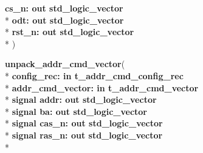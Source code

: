 \begin{DoxyCompactItemize}
  {\bfseries \textcolor{vhdlchar}{ }\textcolor{vhdlchar}{cs\+\_\+n\+: }\textcolor{stringliteral}{} {\bfseries \textcolor{keywordflow}{out}\textcolor{vhdlchar}{ }\textcolor{comment}{std\+\_\+logic\+\_\+vector}\textcolor{vhdlchar}{ }}}\\*
  {\bfseries \textcolor{vhdlchar}{ }\textcolor{vhdlchar}{odt\+: }\textcolor{stringliteral}{} {\bfseries \textcolor{keywordflow}{out}\textcolor{vhdlchar}{ }\textcolor{comment}{std\+\_\+logic\+\_\+vector}\textcolor{vhdlchar}{ }}}\\*
  {\bfseries \textcolor{vhdlchar}{ }\textcolor{vhdlchar}{rst\+\_\+n\+: }\textcolor{stringliteral}{} {\bfseries \textcolor{keywordflow}{out}\textcolor{vhdlchar}{ }\textcolor{comment}{std\+\_\+logic\+\_\+vector}\textcolor{vhdlchar}{ }}}\\*
   )
\item 
{\bfseries {\bfseries \textcolor{vhdlchar}{ }}} {\bf unpack\+\_\+addr\+\_\+cmd\+\_\+vector}( \\*
{\bfseries \textcolor{vhdlchar}{ }\textcolor{vhdlchar}{config\+\_\+rec\+: }\textcolor{stringliteral}{} {\bfseries \textcolor{keywordflow}{in}\textcolor{vhdlchar}{ }{\bfseries {\bf t\+\_\+addr\+\_\+cmd\+\_\+config\+\_\+rec}} \textcolor{vhdlchar}{ }}}\\*
  {\bfseries \textcolor{vhdlchar}{ }\textcolor{vhdlchar}{addr\+\_\+cmd\+\_\+vector\+: }\textcolor{stringliteral}{} {\bfseries \textcolor{keywordflow}{in}\textcolor{vhdlchar}{ }{\bfseries {\bf t\+\_\+addr\+\_\+cmd\+\_\+vector}} \textcolor{vhdlchar}{ }}}\\*
  {\bfseries \textcolor{keywordflow}{signal }\textcolor{vhdlchar}{addr\+: }\textcolor{stringliteral}{} {\bfseries \textcolor{keywordflow}{out}\textcolor{vhdlchar}{ }\textcolor{comment}{std\+\_\+logic\+\_\+vector}\textcolor{vhdlchar}{ }}}\\*
  {\bfseries \textcolor{keywordflow}{signal }\textcolor{vhdlchar}{ba\+: }\textcolor{stringliteral}{} {\bfseries \textcolor{keywordflow}{out}\textcolor{vhdlchar}{ }\textcolor{comment}{std\+\_\+logic\+\_\+vector}\textcolor{vhdlchar}{ }}}\\*
  {\bfseries \textcolor{keywordflow}{signal }\textcolor{vhdlchar}{cas\+\_\+n\+: }\textcolor{stringliteral}{} {\bfseries \textcolor{keywordflow}{out}\textcolor{vhdlchar}{ }\textcolor{comment}{std\+\_\+logic\+\_\+vector}\textcolor{vhdlchar}{ }}}\\*
  {\bfseries \textcolor{keywordflow}{signal }\textcolor{vhdlchar}{ras\+\_\+n\+: }\textcolor{stringliteral}{} {\bfseries \textcolor{keywordflow}{out}\textcolor{vhdlchar}{ }\textcolor{comment}{std\+\_\+logic\+\_\+vector}\textcolor{vhdlchar}{ }}}\\*

\end{DoxyCompactItemize}
